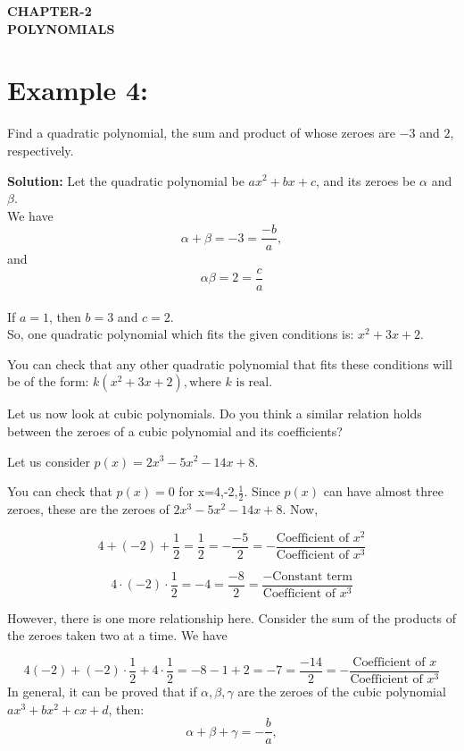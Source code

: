 \documentclass[12pt]{article}
\newcommand{\solution}{\noindent \textbf{Solution: }}
\begin{document}
\begin{center}
\textbf{\Large CHAPTER-2 \\ POLYNOMIALS}
\end{center}

\section*{Example 4:} 

Find a quadratic polynomial, the sum and product of whose zeroes are $-3$ and $2$, respectively.

\solution Let the quadratic polynomial be $ax^2 + bx + c$, and its zeroes be $\alpha$ and $\beta$. \\
We have
\[\alpha + \beta = -3 = \frac{-b}{a},\]
and \[\alpha\beta=2=\frac{c}{a}\]
\\If $a = 1$, then $b=3$ and $c=2.$
\\So, one quadratic polynomial which fits the given conditions is:
$x^2 + 3x + 2.$

You can check that any other quadratic polynomial that fits these conditions will be of the form:
$k(x^2 + 3x + 2), \text {where \(k\) is real.}$

Let us now look at cubic polynomials. Do you think a similar relation holds
between the zeroes of a cubic polynomial and its coefficients?

Let us consider $p(x)=2x^3-5x^2-14x+8.$

You can check that $p(x)=0$ for x=4,-2,$\frac{1}{2}$. Since $p(x)$ can have almost three zeroes, these are the zeroes of $2x^3-5x^2-14x+8.$ Now,


\quad {}
\[4 + (-2) + \frac{1}{2} = \frac{1}{2} = -\frac{-5}{2} = -\frac{\text{Coefficient of } x^2}{\text{Coefficient of } x^3}\]

\quad {}
\[4 \cdot (-2) \cdot \frac{1}{2} = -4 = \frac{-8}{2} = \frac{-\text{Constant term}}{\text{Coefficient of } x^3}\]

However, there is one more relationship here. Consider the sum of the products
of the zeroes taken two at a time. We have


\[4 (-2) + (-2) \cdot \frac{1}{2} + 4 \cdot \frac{1}{2} = -8 -1 + 2 = -7 = \frac{-14}{2} = -\frac{\text{Coefficient of } x}{\text{Coefficient of } x^3}\]
In general, it can be proved that if $\alpha, \beta, \gamma$ are the zeroes of the cubic polynomial $ax^3 + bx^2 + cx + d$, then:
\[\alpha + \beta + \gamma = -\frac{b}{a},\]
\end{document}
